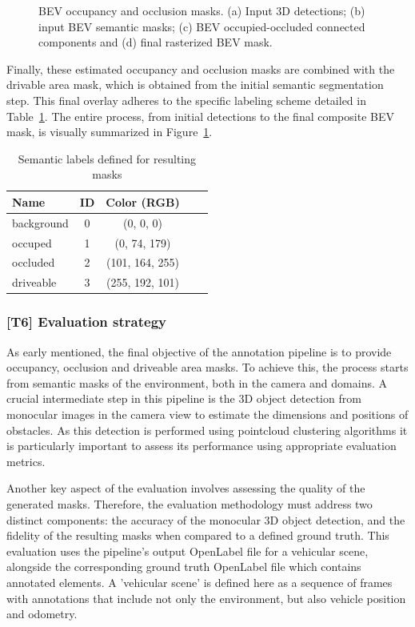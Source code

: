 \begin{figure}[h!]
    \caption{BEV occupancy and occlusion masks. (a) Input 3D detections; (b) input BEV semantic masks; (c) BEV occupied-occluded connected components and (d) final rasterized BEV mask.}
    \label{fig:bev_occupancy_occlusion}
\end{figure}


Finally, these estimated occupancy and occlusion masks are combined with the  drivable area mask, which is obtained from the initial semantic segmentation step. This final overlay adheres to the specific labeling scheme detailed in Table~\ref{tab:occ2_labels}. The entire process, from initial detections to the final composite BEV mask, is visually summarized in Figure~\ref{fig:bev_occupancy_occlusion}.

\begin{table}[h]
    \centering
    \begin{tabular}{l c c c c}
        \toprule
        \textbf{Name} & \textbf{ID} & \textbf{Color (RGB)} \\
        \midrule
        background  & 0 & (0, 0, 0)         \\
        occuped     & 1 & (0, 74, 179)      \\
        occluded    & 2 & (101, 164, 255)   \\
        driveable   & 3 & (255, 192, 101)   \\

        \bottomrule
    \end{tabular}
    \caption{Semantic labels defined for resulting masks}
    \label{tab:occ2_labels}
\end{table}

\subsubsection{[T6] Evaluation strategy}
As early mentioned, the final objective of the annotation pipeline is to provide occupancy, occlusion and driveable area masks. To achieve this, the process starts from semantic masks of the environment, both in the camera and  domains. A crucial intermediate step in this pipeline is the 3D object detection from monocular images in the camera view to estimate the dimensions and positions of obstacles. As this detection is performed using pointcloud clustering algorithms it is particularly important to assess its performance using appropriate evaluation metrics.

Another key aspect of the evaluation involves assessing the quality of the generated  masks. Therefore, the evaluation methodology must address two distinct components: the accuracy of the monocular 3D object detection, and the fidelity of the resulting  masks when compared to a defined ground truth. This evaluation uses the pipeline's output OpenLabel file for a vehicular scene, alongside the corresponding ground truth OpenLabel file which contains annotated elements. A 'vehicular scene' is defined here as a sequence of frames with annotations that include not only the environment, but also vehicle position and odometry.

